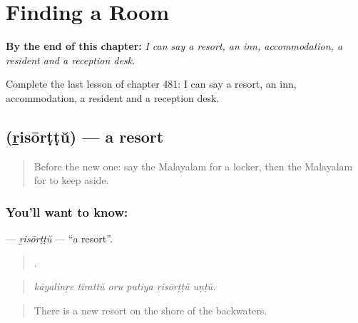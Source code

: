 
\chapter{Finding a Room}
\label{ch:ml-finding-a-room}

\begin{chapteropening}
\textbf{By the end of this chapter:} \emph{I can say a resort, an inn, accommodation, a resident and a reception desk.}

Complete the last lesson of chapter 481: I can say a resort, an inn, accommodation, a resident and a reception desk.
\end{chapteropening}

\section[\texorpdfstring{\ml{റിസോർട്ട്} (ṟisōrṭṭŭ)}{റിസോർട്ട് (ṟisōrṭṭŭ)}]{ (ṟisōrṭṭŭ) — a resort}

\label{lesson:ML-C481-risorttu}



\begin{quote}
Before the new one: say the Malayalam for a locker, then the Malayalam for to keep aside.
\end{quote}

\subsection*{You'll want to know: }
\textbf{} — \emph{ṟisōrṭṭŭ} — \textquotedblleft{}a resort\textquotedblright{}.

\begin{quote}
     .
\end{quote}

\begin{quote}
\emph{kāyalinṟe tīrattŭ oru putiya ṟisōrṭṭŭ uṇṭŭ.}
\end{quote}

\begin{quote}
There is a new resort on the shore of the backwaters.
\end{quote}

